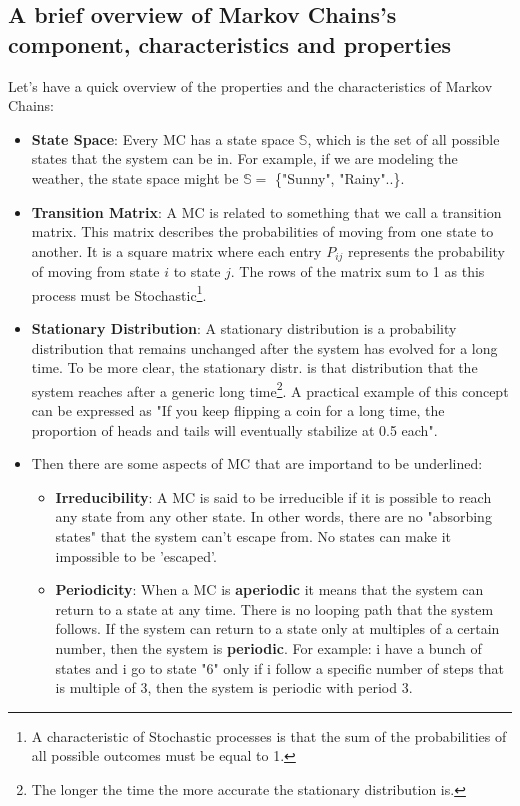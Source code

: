 \documentclass[a4paper]{article}
\begin{document}
\subsection{A brief overview of Markov Chains's component, characteristics and properties}
Let's have a quick overview of the properties and the characteristics of Markov Chains:
\begin{itemize}
    \item \textbf{State Space}: Every MC has a state space $\mathbb{S}$, which is the set of all possible states that the system can be in. For example, if we are modeling the weather, the state space might be $\mathbb{S} = $ \{"Sunny", "Rainy"..\}.
    \item \textbf{Transition Matrix}: A MC is related to something that we call a transition matrix. This matrix describes the probabilities of moving from one state to another. It is a square matrix where each entry $P_{ij}$ represents the probability of moving from state $i$ to state $j$. The rows of the matrix sum to 1 as this process must be Stochastic\footnote{A characteristic of Stochastic processes is that the sum of the probabilities of all possible outcomes must be equal to 1.}.
    \item \textbf{Stationary Distribution}: A stationary distribution is a probability distribution that remains unchanged after the system has evolved for a long time. To be more clear, the stationary distr. is that distribution that the system reaches after a generic long time\footnote{The longer the time the more accurate the stationary distribution is.}. A practical example of this concept can be expressed as "If you keep flipping a coin for a long time, the proportion of heads and tails will eventually stabilize at 0.5 each".
    \item Then there are some aspects of MC that are importand to be underlined: \begin{itemize}
        \item \textbf{Irreducibility}: A MC is said to be irreducible if it is possible to reach any state from any other state. In other words, there are no "absorbing states" that the system can't escape from. No states can make it impossible to be 'escaped'.
        \item \textbf{Periodicity}: When a MC is \textbf{aperiodic} it means that the system can return to a state at any time. There is no looping path that the system follows. If the system can return to a state only at multiples of a certain number, then the system is \textbf{periodic}. For example: i have a bunch of states and i go to state "6" only if i follow a specific number of steps that is multiple of 3, then the system is periodic with period 3.

\end{itemize}
\end{itemize}
\end{document}
